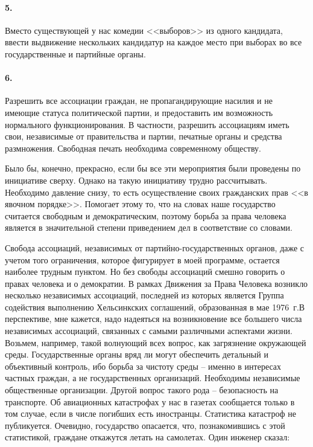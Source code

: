 \documentclass{book}
\begin{document}
\paragraph{5.} Вместо существующей у нас комедии <<выборов>> из одно­го кандидата, ввести выдвижение нескольких кандидатур на каждое место при выборах во все государственные и партий­ные органы.

\paragraph{6.} Разрешить все ассоциации граждан, не пропагандирующие насилия и не имеющие статуса политической партии, и предоста­вить им возможность нормального функционирования. В частно­сти, разрешить ассоциациям иметь свои, независимые от прави­тельства и партии, печатные органы и средства размножения. Свободная печать необходима современному обществу.

Было бы, конечно, прекрасно, если бы все эти мероприятия были проведены по инициативе сверху. Однако на такую инициа­тиву трудно рассчитывать. Необходимо давление снизу, то есть осуществление своих гражданских прав <<в явочном порядке>>. Помогает этому то, что на словах наше государство считается свободным и демократическим, поэтому борьба за права челове­ка является в значительной степени приведением дел в соответ­ствие со словами.

Свобода ассоциаций, независимых от партийно-государствен­ных органов, даже с учетом того ограничения, которое фигури­рует в моей программе, остается наиболее трудным пунктом. Но без свободы ассоциаций смешно говорить о правах человека и о демократии. В рамках Движения за Права Человека возникло несколько независимых ассоциаций, последней из которых яв­ляется Группа содействия выполнению Хельсинкских соглаше­ний, образованная в мае 1976~г.В перспективе, мне кажется, на­до надеяться на возникновение все большего числа независимых ассоциаций, связанных с самыми различными аспектами жизни. Возьмем, например, такой волнующий всех вопрос, как загряз­нение окружающей среды. Государственные органы вряд ли мо­гут обеспечить детальный и объективный контроль, ибо борьба за чистоту среды -- именно в интересах частных граждан, а не го­сударственных организаций. Необходимы независимые общест­венные организации. Другой вопрос такого рода -- безопасность на транспорте. Об авиационных катастрофах у нас в газетах сооб­щается 
только в том случае, если в числе погибших есть иност­ранцы. Статистика катастроф не публикуется. Очевидно, госу­дарство опасается, что, познакомившись с этой статистикой, граждане откажутся летать на самолетах. Один инженер сказал:
\end{document}
